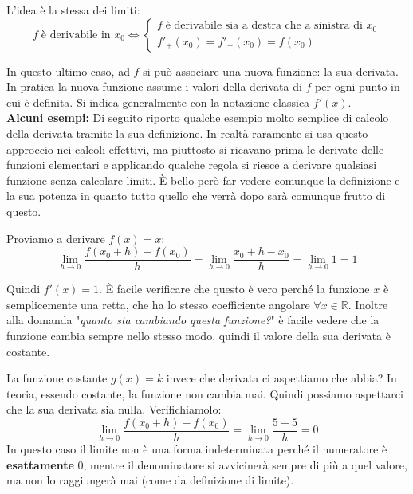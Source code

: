 L'idea è la stessa dei limiti:
\begin{equation*}
	f \; \text{è derivabile in } x_0 \iff
	\begin{cases*}
		f \; \text{è derivabile sia a destra che a sinistra di } x_0\\
		f'_+(x_0) = f'_-(x_0) = f(x_0)
	\end{cases*}
\end{equation*}

In questo ultimo caso, ad $f$ si può associare una nuova funzione: la sua 
derivata. In pratica la nuova funzione assume i valori della derivata di $f$ 
per ogni punto in cui è definita. Si indica generalmente con la notazione 
classica $f'(x)$.\\

\textbf{Alcuni esempi:} Di seguito riporto qualche esempio molto semplice di 
calcolo della derivata tramite la sua definizione. In realtà raramente si usa 
questo approccio nei calcoli effettivi, ma piuttosto si ricavano prima le 
derivate delle funzioni elementari e applicando qualche regola si riesce a 
derivare qualsiasi funzione senza calcolare limiti. È bello però far vedere 
comunque la definizione e la sua potenza in quanto tutto quello che verrà dopo 
sarà comunque frutto di questo.

Proviamo a derivare $f(x) = x$:
\begin{equation*}
	\lim_{h \to 0} \dfrac{f(x_0 + h) - f(x_0)}{h} = \lim_{h \to 0} \dfrac{x_0 
    + h -x_0}{h} = \lim_{h \to 0} 1 = 1
\end{equation*}

Quindi $f'(x) = 1$. È facile verificare che questo è vero perché la funzione 
$x$ è semplicemente una retta, che ha lo stesso coefficiente angolare $\forall 
x \in \mathbb{R}$. Inoltre alla domanda "\textit{quanto sta cambiando questa 
funzione?}" è facile vedere che la funzione cambia sempre nello stesso modo, 
quindi il valore della sua derivata è costante.

La funzione costante $g(x) = k$ invece che derivata ci aspettiamo che abbia? 
In teoria, essendo costante, la funzione non cambia mai. Quindi possiamo 
aspettarci che la sua derivata sia nulla. Verifichiamolo:
\begin{equation*}
	\lim_{h \to 0} \dfrac{f(x_0 + h) - f(x_0)}{h} = \lim_{h \to 0} 
    \dfrac{5 - 5}{h} = 0
\end{equation*}
In questo caso il limite non è una forma indeterminata perché il numeratore è 
\textbf{esattamente} $0$, mentre il denominatore si avvicinerà sempre di più a 
quel valore, ma non lo raggiungerà mai (come da definizione di limite).

